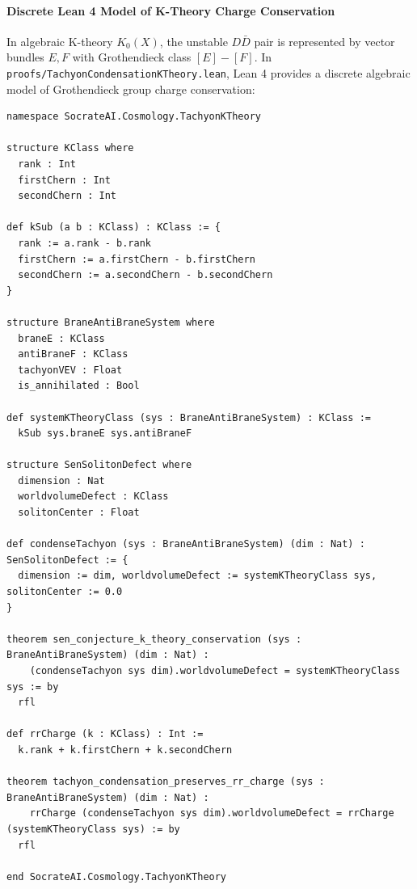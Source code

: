 \documentclass[11pt,a4paper]{article}
\begin{document}
\paragraph{Discrete Lean 4 Model of K-Theory Charge Conservation}
In algebraic K-theory $K_0(X)$, the unstable $D\bar{D}$ pair is represented by vector bundles $E, F$ with Grothendieck class $[E] - [F]$. In \texttt{proofs/TachyonCondensationKTheory.lean}, Lean 4 provides a discrete algebraic model of Grothendieck group charge conservation:

\begin{lstlisting}[language=lean, caption={Lean 4 Discrete Model of Sen's Conjecture and K-Theory Charge Conservation}, label={lst:tachyon_proof}]
namespace SocrateAI.Cosmology.TachyonKTheory

structure KClass where
  rank : Int
  firstChern : Int
  secondChern : Int

def kSub (a b : KClass) : KClass := {
  rank := a.rank - b.rank
  firstChern := a.firstChern - b.firstChern
  secondChern := a.secondChern - b.secondChern
}

structure BraneAntiBraneSystem where
  braneE : KClass
  antiBraneF : KClass
  tachyonVEV : Float
  is_annihilated : Bool

def systemKTheoryClass (sys : BraneAntiBraneSystem) : KClass :=
  kSub sys.braneE sys.antiBraneF

structure SenSolitonDefect where
  dimension : Nat
  worldvolumeDefect : KClass
  solitonCenter : Float

def condenseTachyon (sys : BraneAntiBraneSystem) (dim : Nat) : SenSolitonDefect := {
  dimension := dim, worldvolumeDefect := systemKTheoryClass sys, solitonCenter := 0.0
}

theorem sen_conjecture_k_theory_conservation (sys : BraneAntiBraneSystem) (dim : Nat) :
    (condenseTachyon sys dim).worldvolumeDefect = systemKTheoryClass sys := by
  rfl

def rrCharge (k : KClass) : Int :=
  k.rank + k.firstChern + k.secondChern

theorem tachyon_condensation_preserves_rr_charge (sys : BraneAntiBraneSystem) (dim : Nat) :
    rrCharge (condenseTachyon sys dim).worldvolumeDefect = rrCharge (systemKTheoryClass sys) := by
  rfl

end SocrateAI.Cosmology.TachyonKTheory
\end{lstlisting}
\end{document}
